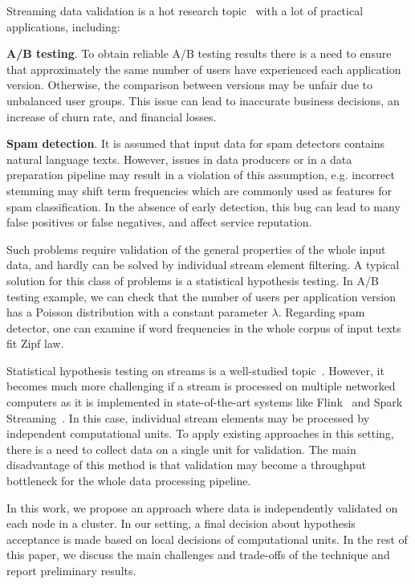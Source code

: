 \label {fs-short-intro}

Streaming data validation is a hot research topic~\cite{Xu:2013:MVS:2488222.2488275, frank2018semantic} with a lot of practical applications, including:

{\bf A/B testing}. To obtain reliable A/B testing results there is a need to ensure that approximately the same number of users have experienced each application version. Otherwise, the comparison between versions may be unfair due to unbalanced user groups. This issue can lead to inaccurate business decisions, an increase of churn rate, and financial losses.
    
{\bf Spam detection}. It is assumed that input data for spam detectors contains natural language texts. However, issues in data producers or in a data preparation pipeline may result in a violation of this assumption, e.g. incorrect stemming may shift term frequencies which are commonly used as features for spam classification. In the absence of early detection, this bug can lead to many false positives or false negatives, and affect service reputation.

Such problems require validation of the general properties of the whole input data, and hardly can be solved by individual stream element filtering. A typical solution for this class of problems is a statistical hypothesis testing. In A/B testing example, we can check that the number of users per application version has a Poisson distribution with a constant parameter $\lambda$. Regarding spam detector, one can examine if word frequencies in the whole corpus of input texts fit Zipf law. 

Statistical hypothesis testing on streams is a well-studied topic~\cite{kifer2004detecting, lall2015data}. However, it becomes much more challenging if a stream is processed on multiple networked computers as it is implemented in state-of-the-art systems like Flink~\cite{Carbone:2017:SMA:3137765.3137777} and Spark Streaming~\cite{Zaharia:2012:DSE:2342763.2342773}. In this case, individual stream elements may be processed by independent computational units. To apply existing approaches in this setting, there is a need to collect data on a single unit for validation. The main disadvantage of this method is that validation may become a throughput bottleneck for the whole data processing pipeline. 

In this work, we propose an approach where data is independently validated on each node in a cluster. In our setting, a final decision about hypothesis acceptance is made based on local decisions of computational units. In the rest of this paper, we discuss the main challenges and trade-offs of the technique and report preliminary results.